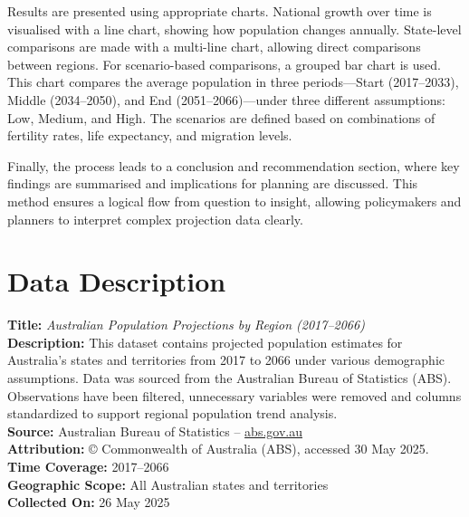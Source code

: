 \documentclass[
  11pt,
]{article}
\begin{document}
Results are presented using appropriate charts. National growth over
time is visualised with a line chart, showing how population changes
annually. State-level comparisons are made with a multi-line chart,
allowing direct comparisons between regions. For scenario-based
comparisons, a grouped bar chart is used. This chart compares the
average population in three periods---Start (2017--2033), Middle
(2034--2050), and End (2051--2066)---under three different assumptions:
Low, Medium, and High. The scenarios are defined based on combinations
of fertility rates, life expectancy, and migration levels.

Finally, the process leads to a conclusion and recommendation section,
where key findings are summarised and implications for planning are
discussed. This method ensures a logical flow from question to insight,
allowing policymakers and planners to interpret complex projection data
clearly.

\section{Data Description}\label{data-description}

\begin{tcolorbox}[enhanced jigsaw, breakable, opacityback=0, leftrule=.75mm, opacitybacktitle=0.6, rightrule=.15mm, title=\textcolor{quarto-callout-note-color}{\faInfo}\hspace{0.5em}{Meta Data}, coltitle=black, colbacktitle=quarto-callout-note-color!10!white, colback=white, colframe=quarto-callout-note-color-frame, arc=.35mm, titlerule=0mm, left=2mm, bottomtitle=1mm, toprule=.15mm, bottomrule=.15mm, toptitle=1mm]

\textbf{Title:} \emph{Australian Population Projections by Region
(2017--2066)}\\
\textbf{Description:} This dataset contains projected population
estimates for Australia's states and territories from 2017 to 2066 under
various demographic assumptions. Data was sourced from the Australian
Bureau of Statistics (ABS). Observations have been filtered, unnecessary
variables were removed and columns standardized to support regional
population trend analysis.\\
\textbf{Source:} Australian Bureau of Statistics --
\href{https://www.abs.gov.au}{abs.gov.au}\\
\textbf{Attribution:} © Commonwealth of Australia (ABS), accessed 30 May
2025.\\
\textbf{Time Coverage:} 2017--2066\\
\textbf{Geographic Scope:} All Australian states and territories\\
\textbf{Collected On:} 26 May 2025

\end{tcolorbox}
\end{document}
